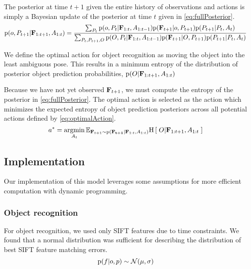             The posterior at time $t+1$ given the entire history of observations and actions is simply a Bayesian update of the posterior at time $t$ given in \eqref{eq:fullPosterior}.
            \begin{equation}
                \label{eq:fullPosterior}
                \prob{o,P_{t+1}|\set{F}_{1:t+1},A_{1:t}} = \frac{ \sum_{P_t} \prob{o,P_t|\set{F}_{1:t},A_{1:t-1}} \prob{\set{F}_{t+1}|o,P_{t+1}} \prob{P_{t+1}|P_t,A_t}}{\sum_{P_t,P_{t+1},O} \prob{O,P_t|\set{F}_{1:t},A_{1:t-1}} \prob{\set{F}_{t+1}|O,P_{t+1}} \prob{P_{t+1}|P_t,A_t}}
            \end{equation}
            
            We define the optimal action for object recognition as moving the object into the least ambiguous pose. This results in a minimum entropy of the distribution of posterior object prediction probabilities, $\text{p}(O|\mathbf{F}_{1:t+1},A_{1:t})$

            Because we have not yet observed $\mathbf{F}_{t+1}$, we must compute the  entropy of the posterior in \eqref{eq:fullPosterior}. The optimal action is selected as the action which minimizes the expected entropy of object prediction posteriors across all potential actions defined by \eqref{eq:optimalAction}.
            \begin{equation}
                \label{eq:optimalAction}
                a^* = \argmin_{A_t} \expectedValue{ \entropy{O|\set{F}_{1:t+1},A_{1:t}} }{\set{F}_{t+1} \sim \prob{\set{F_{t+1}}|\set{F}_{1:t},A_{1:t}}}
            \end{equation}
            
    \subsection{Implementation}

        Our implementation of this model leverages some assumptions for more efficient computation with dynamic programming.

        \subsubsection{Object recognition}

            For object recognition, we used only SIFT features due to time constraints. We found that a normal distribution was sufficient for describing the distribution of best SIFT feature matching errors.
            \begin{equation}
                \text{p}(f|o,p) \sim \mathcal{N}(\mu,\sigma)
            \end{equation}

